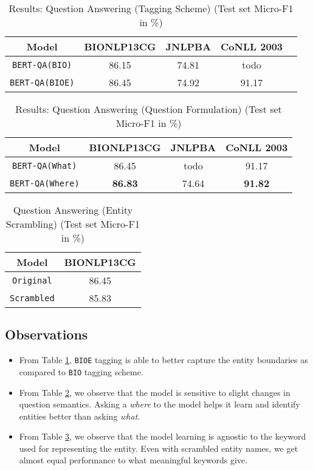 \begin{table}[h!]
\centering
\begin{tabular}{|c|c|c|c|c|}\hline
	\textbf{Model} & \textbf{BIONLP13CG} & \textbf{JNLPBA} & \textbf{CoNLL 2003}\\\hline
	\texttt{BERT-QA(BIO)} & 86.15 & 74.81 & todo\\\hline
	\texttt{BERT-QA(BIOE)} & 86.45 & 74.92 & 91.17\\\hline
	\end{tabular}
    \caption{Results: Question Answering (Tagging Scheme) (Test set Micro-F1 in \%)}
    \label{tab:res_qa_tagging}
\end{table}

\begin{table}[h!]
\centering
\begin{tabular}{|c|c|c|c|}\hline
	\textbf{Model} & \textbf{BIONLP13CG} & \textbf{JNLPBA} & \textbf{CoNLL 2003}\\\hline
	\texttt{BERT-QA(What)} & 86.45 & todo & 91.17\\\hline
	\texttt{BERT-QA(Where)} & \textbf{86.83} & 74.64 & \textbf{91.82}\\\hline
	\end{tabular}
    \caption{Results: Question Answering (Question Formulation) (Test set Micro-F1 in \%)}
    \label{tab:res_qa_question}
\end{table}

\begin{table}[h!]
\centering
\begin{tabular}{|c|c|}\hline
	\textbf{Model} & \textbf{BIONLP13CG}\\\hline
	\texttt{Original} & 86.45\\\hline
	\texttt{Scrambled} & 85.83\\\hline
	\end{tabular}
    \caption{Question Answering (Entity Scrambling) (Test set Micro-F1 in \%)}
    \label{tab:res_qa_scrable}
\end{table}

\subsection{Observations}
\begin{itemize}
    \item From Table \ref{tab:res_qa_tagging}, \texttt{BIOE} tagging is able to better capture the entity boundaries as compared to \texttt{BIO} tagging scheme.
    
    \item From Table \ref{tab:res_qa_question}, we observe that the model is sensitive to slight changes in question semantics. Asking a \textit{where} to the model helps it learn and identify entities better than asking \textit{what}. 
    
    \item From Table \ref{tab:res_qa_scrable}, we observe that the model learning is agnostic to the keyword used for representing the entity. Even with scrambled entity names, we get almost equal performance to what meaningful keywords give.
\end{itemize}

